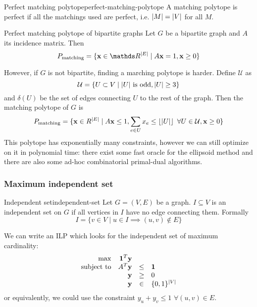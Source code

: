 \documentclass[12pt]{extarticle}
\renewcommand{\vec}[1]{\bvec{#1}}
\begin{document}
\begin{definition}{Perfect matching polytope}{perfect-matching-polytope}
	A matching polytope is perfect if all the matchings used are perfect, i.e. $\abs{M} = \abs{V}$ for
	all $M$.
\end{definition}

\begin{lemma}{Perfect matching polytope of bipartite graphs}{}
	Let $G$ be a bipartite graph and $A$ its incidence matrix. Then
	\begin{equation}
		P_\text{matching} = \{ \vec x \in \R^\abs{E} \mid A \vec x = 1, \vec x \geq 0\}
	\end{equation}
\end{lemma}

However, if $G$ is not bipartite, finding a marching polytope is harder.
Define $\mathcal U$ as
\begin{equation}
	\mathcal U = \{ U \subset V \mid \abs{U} \text{ is odd}, \abs{U} \geq 3 \}
\end{equation}
and $\delta(U)$ be the set of edges connecting $U$ to the rest of the graph.
Then the matching polytope of $G$ is
\begin{equation}
	P_\text{matching} = \{ \vec x \in R^\abs{E} \mid A \vec x \leq 1,
	\sum_{e \in U} x_e \leq \floor{\abs{U}} \enspace \forall U \in \mathcal U,
	\vec x \geq 0\}
\end{equation}
This polytope has exponentially many constraints, however we can still optimize on it in polynomial
time: there exist some fast oracle for the ellipsoid method and there are also some ad-hoc
combinatorial primal-dual algorithms.

\subsubsection{Maximum independent set}

\begin{definition}{Independent set}{independent-set}
	Let $G = (V, E)$ be a graph. $I \subseteq V$ is an independent set on $G$ if all vertices in $I$
	have no edge connecting them. Formally
	\begin{equation}
		I = \{ v \in V \mid u \in I \implies (u, v) \notin E \}
	\end{equation}
\end{definition}

We can write an ILP which looks for the independent set of maximum cardinality:
\begin{equation}
	\begin{array}{rrcl}
		\max              & \vec 1^T \vec y &      &                  \\
		\text{subject to} & A^T \vec y      & \leq & \vec 1           \\
		                  & \vec y          & \geq & 0                \\
		                  & \vec y          & \in  & \{0, 1\}^\abs{V}
	\end{array}
\end{equation}
or equivalently, we could use the constraint $y_u + y_v \leq 1$ $\forall (u, v) \in E$.
\end{document}
